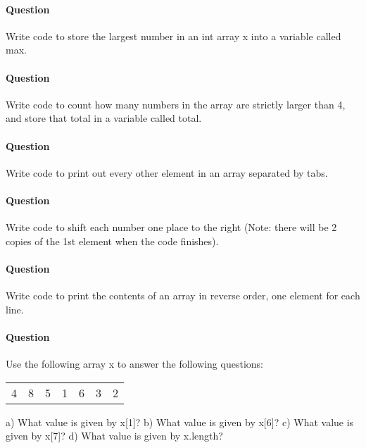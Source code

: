 \documentclass{article}
\begin{document}
\addtocounter{question_num}{1}
\paragraph{Question }
Write code to store the largest number in an int array x into a variable called max.

\addtocounter{question_num}{1}
\paragraph{Question }
Write code to count how many numbers in the array are strictly larger than 4, and store that total in a variable called total.

\addtocounter{question_num}{1}
\paragraph{Question }
Write code to print out every other element in an array separated by tabs.

\addtocounter{question_num}{1}
\paragraph{Question }
Write code to shift each number one place to the right (Note: there will be 2 copies of the 1st element when the code finishes).

\addtocounter{question_num}{1}
\paragraph{Question }
Write code to print the contents of an array in reverse order, one element for each line.

\addtocounter{question_num}{1}
\paragraph{Question }
Use the following array x to answer the following questions:
\begin{table}[h]
\begin{tabular}{lllllll}
4 & 8 & 5 & 1 & 6 & 3 & 2
\end{tabular}
\end{table}
\newline
a) What value is given by x[1]?
\newline b) What value is given by x[6]?
\newline c) What value is given by x[7]?
\newline d) What value is given by x.length?
\end{document}
